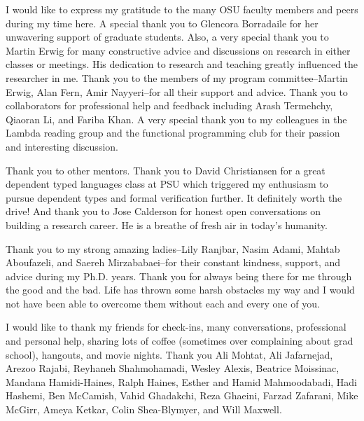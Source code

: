 I would like to express my gratitude to the many OSU faculty members and peers during my time here. 
A special thank you to Glencora Borradaile for her unwavering support 
of graduate students. Also, a very special thank you to Martin Erwig for many 
constructive advice and discussions on 
research in either classes or meetings. His dedication to research and teaching 
greatly influenced the researcher in me.
Thank you to the members of my program committee--Martin Erwig, 
Alan Fern, Amir Nayyeri--for all their support and advice. 
%
Thank you to collaborators for professional help and feedback including
Arash Termehchy, Qiaoran Li, and Fariba Khan. A very special thank you
to my colleagues in the Lambda reading group and the functional programming club 
for their passion and interesting discussion.

%
Thank you to other mentors. 
Thank you to David Christiansen for a great dependent typed languages class at PSU
which triggered my enthusiasm to pursue dependent types and formal verification further. It definitely
worth the drive!
And thank you to Jose Calderson for honest open conversations on building a research career. He is
a breathe of fresh air in today's humanity.
%


Thank you to my strong amazing ladies--Lily Ranjbar, 
Nasim Adami, Mahtab Aboufazeli, and Saereh Mirzababaei--for their constant kindness, 
support, and advice during my Ph.D. years. Thank you for always being there for me 
through the good and the bad. Life has thrown some harsh obstacles my way and I 
would not have been able to overcome them without each and every one of you. 
%

%
I would like to thank my friends for 
check-ins, many conversations, professional and personal help, sharing lots of coffee (sometimes over complaining about grad school), hangouts, and movie nights.
Thank you Ali Mohtat, Ali Jafarnejad, 
Arezoo Rajabi, Reyhaneh Shahmohamadi, Wesley Alexis,
Beatrice Moissinac, Mandana Hamidi-Haines, Ralph Haines, 
Esther and Hamid Mahmoodabadi, Hadi Hashemi, Ben McCamish, Vahid Ghadakchi, Reza Ghaeini, Farzad Zafarani, Mike McGirr, Ameya Ketkar, Colin Shea-Blymyer, and Will Maxwell.
%

